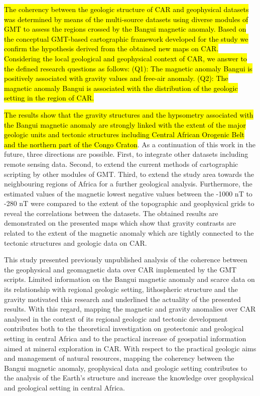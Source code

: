 \documentclass[minerals,article,submit,pdftex,moreauthors]{Definitions/mdpi}
\begin{document}
\hl{The coherency between the geologic structure of CAR and geophysical datasets was determined by means of the multi-source datasets using diverse modules of GMT to assess the regions crossed by the Bangui magnetic anomaly. Based on the conceptual GMT-based cartographic framework developed for the study we confirm the hypothesis derived from the obtained new maps on CAR. Considering the local geological and geophysical context of CAR, we answer to the defined research questions as follows: (Q1): The magnetic anomaly Bangui is positively associated with gravity values and free-air anomaly. (Q2): The magnetic anomaly Bangui is associated with the distribution of the geologic setting in the region of CAR.}

\hl{The results show that the gravity structures and the hypsometry associated with the Bangui magnetic anomaly are strongly linked with the extent of the major geologic units and tectonic structures including Central African Orogenic Belt and the northern part of the Congo Craton}. As a continuation of this work in the future, three directions are possible. First, to integrate other datasets including remote sensing data. Second, to extend the current methods of cartographic scripting by other modules of GMT. Third, to extend the study area towards the neighbouring regions of Africa for a further geological analysis. Furthermore, the estimated values of the magnetic lowest negative values between the -1000 nT to -280 nT were compared to the extent of the topographic and geophysical grids to reveal the correlations between the datasets. The obtained results are demonstrated on the presented maps which show that gravity contrasts are related to the extent of the magnetic anomaly which are tightly connected to the tectonic structures and geologic data on CAR. 

This study presented previously unpublished analysis of the coherence between the geophysical and geomagnetic data over CAR implemented by the GMT scripts. Limited information on the Bangui magnetic anomaly and scarce data on its relationship with regional geologic setting, lithospheric structure and the gravity motivated this research and underlined the actuality of the presented results. With this regard, mapping the magnetic and gravity anomalies over CAR analysed in the context of its regional geologic and tectonic development contributes both to the theoretical investigation on geotectonic and geological setting in central Africa and to the practical increase of geospatial information aimed at mineral exploration in CAR. With respect to the practical geologic aims and management of natural resources, mapping the coherency between the Bangui magnetic anomaly, geophysical data and geologic setting contributes to the analysis of the Earth's structure and increase the knowledge over geophysical and geological setting in central Africa.
\end{document}
